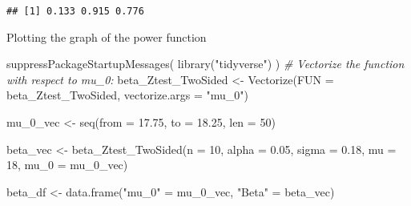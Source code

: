 \documentclass[
]{book}
\newenvironment{Shaded}{\begin{snugshade}}{\end{snugshade}}
\newcommand{\AttributeTok}[1]{\textcolor[rgb]{0.77,0.63,0.00}{#1}}
\newcommand{\CommentTok}[1]{\textcolor[rgb]{0.56,0.35,0.01}{\textit{#1}}}
\newcommand{\DecValTok}[1]{\textcolor[rgb]{0.00,0.00,0.81}{#1}}
\newcommand{\FloatTok}[1]{\textcolor[rgb]{0.00,0.00,0.81}{#1}}
\newcommand{\FunctionTok}[1]{\textcolor[rgb]{0.00,0.00,0.00}{#1}}
\newcommand{\NormalTok}[1]{#1}
\newcommand{\OtherTok}[1]{\textcolor[rgb]{0.56,0.35,0.01}{#1}}
\newcommand{\StringTok}[1]{\textcolor[rgb]{0.31,0.60,0.02}{#1}}
\begin{document}
\begin{verbatim}
## [1] 0.133 0.915 0.776
\end{verbatim}

Plotting the graph of the power function

\begin{Shaded}
\begin{Highlighting}[]
\FunctionTok{suppressPackageStartupMessages}\NormalTok{(}
  \FunctionTok{library}\NormalTok{(}\StringTok{"tidyverse"}\NormalTok{)}
\NormalTok{)}
\CommentTok{\# Vectorize the function with respect to mu\_0:}
\NormalTok{beta\_Ztest\_TwoSided }\OtherTok{\textless{}{-}} \FunctionTok{Vectorize}\NormalTok{(}\AttributeTok{FUN =}\NormalTok{ beta\_Ztest\_TwoSided, }
                                 \AttributeTok{vectorize.args =} \StringTok{"mu\_0"}\NormalTok{)}

\NormalTok{mu\_0\_vec }\OtherTok{\textless{}{-}} \FunctionTok{seq}\NormalTok{(}\AttributeTok{from =} \FloatTok{17.75}\NormalTok{, }\AttributeTok{to =} \FloatTok{18.25}\NormalTok{, }\AttributeTok{len =} \DecValTok{50}\NormalTok{)}

\NormalTok{beta\_vec }\OtherTok{\textless{}{-}} \FunctionTok{beta\_Ztest\_TwoSided}\NormalTok{(}\AttributeTok{n     =}   \DecValTok{10}\NormalTok{, }
                                \AttributeTok{alpha =} \FloatTok{0.05}\NormalTok{, }
                                \AttributeTok{sigma =} \FloatTok{0.18}\NormalTok{, }
                                \AttributeTok{mu    =}  \DecValTok{18}\NormalTok{, }
                                \AttributeTok{mu\_0  =}\NormalTok{ mu\_0\_vec)}

\NormalTok{beta\_df }\OtherTok{\textless{}{-}} \FunctionTok{data.frame}\NormalTok{(}\StringTok{"mu\_0"}  \OtherTok{=}\NormalTok{ mu\_0\_vec,}
                      \StringTok{"Beta"}  \OtherTok{=}\NormalTok{ beta\_vec)}


\end{Highlighting}
\end{Shaded}
\end{document}
